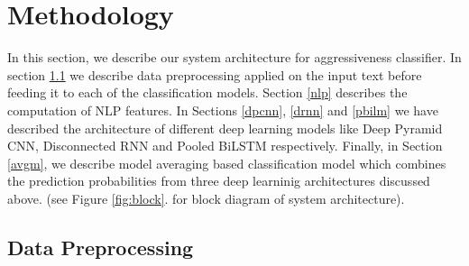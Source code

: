 \documentclass[sigconf]{acmart}
\begin{document}
\section{Methodology}\label{methodology}
In this section, we describe our system architecture for aggressiveness classifier. In section \ref{datap} we describe data preprocessing applied on the input text before feeding it to each of the classification models. Section \ref{nlp} describes the computation of NLP features. In Sections \ref{dpcnn}, \ref{drnn} and \ref{pbilm} we have described the architecture of different deep learning models like Deep Pyramid CNN, Disconnected RNN and Pooled BiLSTM respectively.  Finally, in Section \ref{avgm}, we describe model averaging based classification model which combines the prediction probabilities from three deep learninig architectures discussed above.  (see Figure \ref{fig:block}. for block diagram of system architecture).

\subsection{Data Preprocessing}\label{datap}
\end{document}
